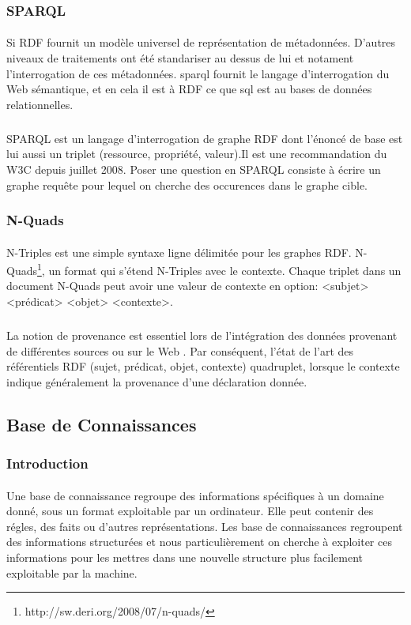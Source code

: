 \documentclass[12pt,a4	]{report}
\begin{document}
\subsubsection*{SPARQL}
\paragraph{}
Si RDF fournit un modèle universel de représentation de métadonnées. D'autres niveaux de traitements ont été standariser au dessus de lui  et notament l'interrogation de ces métadonnées.
\gls{sparql} fournit le langage d'interrogation du Web sémantique, et en cela il est à RDF ce que \gls{sql} est au bases de données relationnelles.
\subparagraph{}
SPARQL est un langage d'interrogation de graphe RDF dont l'énoncé de base est lui aussi un triplet (ressource, propriété, valeur).Il est une recommandation du W3C depuis juillet 2008.
Poser une question en SPARQL consiste à écrire un graphe requête pour lequel on cherche des occurences dans le graphe cible.
\subsubsection*{N-Quads}
\paragraph{}
N-Triples est une simple syntaxe ligne délimitée pour les graphes RDF. N-Quads\footnote{http://sw.deri.org/2008/07/n-quads/}, un format qui s'étend N-Triples avec le contexte. Chaque triplet dans un document N-Quads peut avoir une valeur de contexte en option: 
\newline
<subjet> <prédicat> <objet> <contexte>.
\subparagraph{}
La notion de provenance est essentiel lors de l'intégration des données provenant de différentes sources ou sur le Web . Par conséquent, l'état de l'art des référentiels RDF (sujet, prédicat, objet, contexte) quadruplet, lorsque le contexte indique généralement la provenance d'une déclaration donnée.
\newpage
\subsection*{Base de Connaissances}
\subsubsection*{Introduction}
\paragraph{}
Une base de connaissance regroupe des informations spécifiques à un domaine donné, sous un format exploitable par un ordinateur. Elle peut contenir des régles, des faits ou d'autres représentations. Les base de connaissances regroupent des informations structurées et nous particulièrement on cherche à exploiter ces informations pour les mettres dans une nouvelle structure plus facilement exploitable par la machine.
\end{document}
